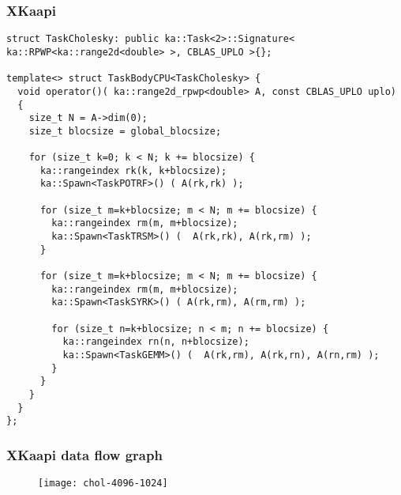 \begin{frame}
  \frametitle{XKaapi}
  \vspace{-4mm}
\begin{block}{}
\begin{lstlisting}[basicstyle=\scriptsize\ttfamily]
struct TaskCholesky: public ka::Task<2>::Signature< ka::RPWP<ka::range2d<double> >, CBLAS_UPLO >{};

template<> struct TaskBodyCPU<TaskCholesky> {
  void operator()( ka::range2d_rpwp<double> A, const CBLAS_UPLO uplo)
  {
    size_t N = A->dim(0);
    size_t blocsize = global_blocsize;
    
    for (size_t k=0; k < N; k += blocsize) {
      ka::rangeindex rk(k, k+blocsize);
      ka::Spawn<TaskPOTRF>() ( A(rk,rk) );
      
      for (size_t m=k+blocsize; m < N; m += blocsize) {
        ka::rangeindex rm(m, m+blocsize);
        ka::Spawn<TaskTRSM>() (  A(rk,rk), A(rk,rm) );
      }
      
      for (size_t m=k+blocsize; m < N; m += blocsize) {
        ka::rangeindex rm(m, m+blocsize);
        ka::Spawn<TaskSYRK>() ( A(rk,rm), A(rm,rm) );
	
        for (size_t n=k+blocsize; n < m; n += blocsize) {
          ka::rangeindex rn(n, n+blocsize);
          ka::Spawn<TaskGEMM>() (  A(rk,rm), A(rk,rn), A(rn,rm) );
        }
      }
    }
  }
};
\end{lstlisting}
\end{block}
\end{frame}
\begin{frame}[plain]
  \frametitle{XKaapi data flow graph}
  \vspace*{-5mm}
  \begin{figure}[ht]
  \centering
  \texttt{[image: chol-4096-1024]}
  \end{figure}
\end{frame}
